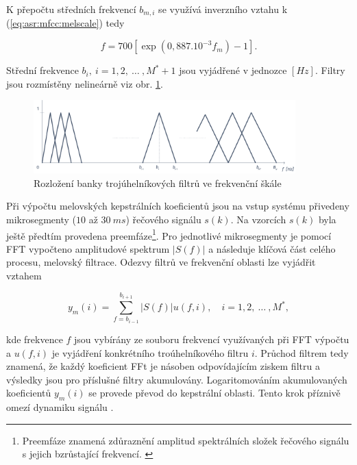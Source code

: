 \noindent K přepočtu středních frekvencí $b_{m,i}$ se využívá inverzního vztahu k (\ref{eq:asr:mfcc:melscale}) tedy

\begin{equation}
  f = 700 \left[ \exp\left( 0,887.10^{-3} f_m \right) - 1 \right].
  \label{eq:asr:mfcc:melscale:inverse}
\end{equation}

\noindent Střední frekvence $b_i,\ i=1,2,\ \dots\ , M^{*}+1$ jsou vyjádřené v jednozce $[Hz]$. Filtry jsou rozmístěny nelineárně viz obr. \ref{fig:asr:mfcc:bank:hz}.

\begin{figure}[hbpt]
  \centering
  \includegraphics[width=0.9\textwidth]{./ch4-asr/img/filter_bank-hz.pdf}
  \caption{Rozložení banky trojúhelníkových filtrů ve frekvenční škále}
  \label{fig:asr:mfcc:bank:hz}
\end{figure}

Při výpočtu melovských kepstrálních koeficientů jsou na vstup systému přivedeny mikrosegmenty ($10$ až $30\ ms$) řečového signálu $s(k)$. Na vzorcích $s(k)$ byla ještě předtím provedena preemfáze\footnote{Preemfáze znamená zdůraznění amplitud spektrálních složek řečového signálu s jejich bzrůstající frekvencí. \cite{Psutka2006}}. Pro jednotlivé mikrosegmenty je pomocí FFT vypočteno amplitudové spektrum $\left| S(f) \right|$ a následuje klíčová část celého procesu, melovský filtrace. Odezvy filtrů ve frekvenční oblasti lze vyjádřit vztahem

\begin{equation}
  y_m(i) = \sum_{f=b_{i-1}}^{b_{i+1}} \left| S(f) \right| u\left(f, i\right),  \quad i = 1, 2,\ \dots\ ,M^{*},
  \label{eq:asr:mfcc:freq:responce}
\end{equation}

\noindent kde frekvence $f$ jsou vybírány ze souboru frekvencí využívaných při FFT výpočtu a $u(f, i)$ je vyjádření konkrétního troúhelníkového filtru $i$. Průchod filtrem tedy znamená, že každý koeficient FFt je násoben odpovídajícím ziskem filtru a výsledky jsou pro příslušné filtry akumulovány. Logaritomováním akumulovaných koeficientů $y_{m}(i)$ se provede převod do kepstrální oblasti. Tento krok příznivě omezí dynamiku signálu \cite{Benesty2007}.

